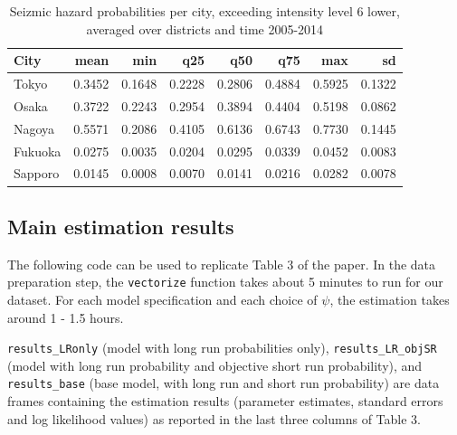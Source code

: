 \documentclass[
]{article}
\begin{document}
\begin{table}[H]

\caption{\label{tab:unnamed-chunk-10}Seizmic hazard probabilities per city, exceeding intensity level 6 lower, averaged over districts and time 2005-2014}
\centering
\begin{tabular}[t]{lrrrrrrr}
\toprule
City & mean & min & q25 & q50 & q75 & max & sd\\
\midrule
Tokyo & 0.3452 & 0.1648 & 0.2228 & 0.2806 & 0.4884 & 0.5925 & 0.1322\\
Osaka & 0.3722 & 0.2243 & 0.2954 & 0.3894 & 0.4404 & 0.5198 & 0.0862\\
Nagoya & 0.5571 & 0.2086 & 0.4105 & 0.6136 & 0.6743 & 0.7730 & 0.1445\\
Fukuoka & 0.0275 & 0.0035 & 0.0204 & 0.0295 & 0.0339 & 0.0452 & 0.0083\\
Sapporo & 0.0145 & 0.0008 & 0.0070 & 0.0141 & 0.0216 & 0.0282 & 0.0078\\
\bottomrule
\end{tabular}
\end{table}

\hypertarget{main-estimation-results}{%
\subsection{Main estimation results}\label{main-estimation-results}}

The following code can be used to replicate Table 3 of the paper. In the
data preparation step, the \texttt{vectorize} function takes about 5
minutes to run for our dataset. For each model specification and each
choice of \(\psi\), the estimation takes around 1 - 1.5 hours.

\texttt{results\_LRonly} (model with long run probabilities only),
\texttt{results\_LR\_objSR} (model with long run probability and
objective short run probability), and \texttt{results\_base} (base
model, with long run and short run probability) are data frames
containing the estimation results (parameter estimates, standard errors
and log likelihood values) as reported in the last three columns of
Table 3.
\end{document}
